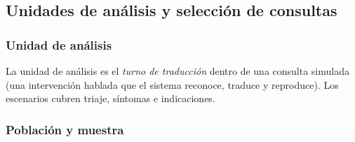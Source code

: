 \subsection{Unidades de an{\'a}lisis y selecci{\'o}n de consultas}

\subsubsection{Unidad de an{\'a}lisis}
La unidad de an{\'a}lisis es el \emph{turno de traducci{\'o}n} dentro de una consulta simulada
(una intervenci{\'o}n hablada que el sistema reconoce, traduce y reproduce). Los escenarios cubren
triaje, s{\'i}ntomas e indicaciones.

\subsubsection{Poblaci{\'o}n y muestra}
